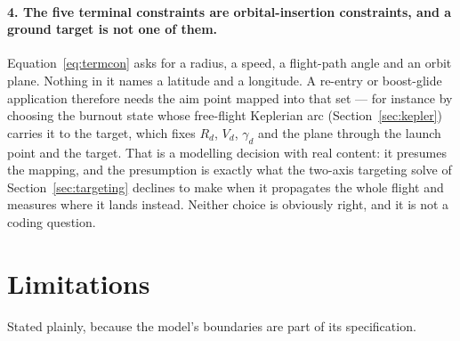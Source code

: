 \documentclass[11pt]{article}
\begin{document}
\paragraph{4. The five terminal constraints are orbital-insertion constraints,
and a ground target is not one of them.} Equation~\eqref{eq:termcon} asks for a
radius, a speed, a flight-path angle and an orbit plane. Nothing in it names a
latitude and a longitude. A re-entry or boost-glide application therefore needs
the aim point mapped into that set --- for instance by choosing the burnout
state whose free-flight Keplerian arc (Section~\ref{sec:kepler}) carries it to
the target, which fixes $R_d$, $V_d$, $\gamma_d$ and the plane through the
launch point and the target. That is a modelling decision with real content:
it presumes the mapping, and the presumption is exactly what the two-axis
targeting solve of Section~\ref{sec:targeting} declines to make when it
propagates the whole flight and measures where it lands instead. Neither
choice is obviously right, and it is not a coding question.

\section{Limitations}

Stated plainly, because the model's boundaries are part of its specification.
\end{document}
